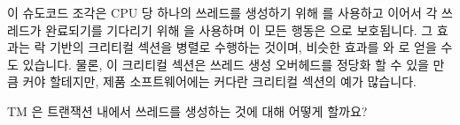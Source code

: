 이 슈도코드 조각은 CPU 당 하나의 쓰레드를 생성하기 위해 
를 사용하고 이어서 각 쓰레드가 완료되기를 기다리기 위해  을
사용하며 이 모든 행동은  으로 보호됩니다.
그 효과는 락 기반의 크리티컬 섹션을 병렬로 수행하는 것이며, 비슷한 효과를
 와  로 얻을 수도 있습니다.
물론, 이 크리티컬 섹션은 쓰레드 생성 오버헤드를 정당화 할 수 있을 만큼 커야
할테지만, 제품 소프트웨어에는 커다란 크리티컬 섹션의 예가 많습니다.

TM 은 트랜잭션 내에서 쓰레드를 생성하는 것에 대해 어떻게 할까요?

